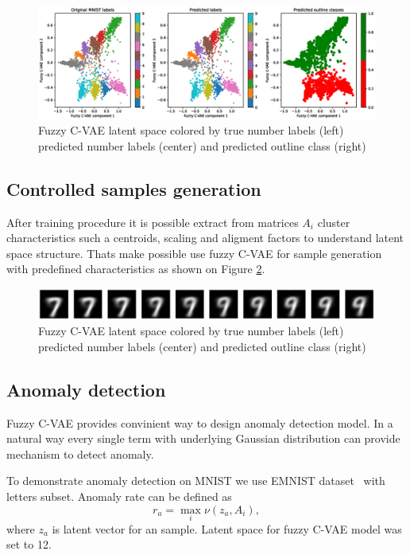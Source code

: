 \documentclass[runningheads]{llncs}
\begin{document}
\begin{figure}
    \centering
    \includegraphics[width=1\textwidth]{fig3-fcvae-classification.eps}
    \caption{Fuzzy C-VAE latent space colored by true number labels (left) predicted number labels (center) and predicted outline class (right) }
    \label{fig:fcvae-classes}
\end{figure}

\subsection{Controlled samples generation}

After training procedure it is possible extract from matrices $A_i$ cluster characteristics such a centroids, scaling and aligment factors to understand latent space structure.
Thats make possible use fuzzy C-VAE for sample generation with predefined characteristics as shown on Figure \ref{fig:samples-generation}.

\begin{figure} 
    \centering
    \includegraphics[width=1\textwidth]{fig4-sample-generation.eps}
    \caption{Fuzzy C-VAE latent space colored by true number labels (left) predicted number labels (center) and predicted outline class (right) }
    \label{fig:samples-generation}
\end{figure}

\subsection{Anomaly detection}

Fuzzy C-VAE provides convinient way to design anomaly detection model.
In a natural way every single term with underlying Gaussian distribution can provide mechanism to detect anomaly. 

To demonstrate anomaly detection on MNIST we use EMNIST dataset~\cite{cohenafshartapsonschaik2017} with letters subset.
Anomaly rate can be defined as 
\[
    r_{a} = \max_i \nu(z_{a}, A_i),
\] 
where $z_{a}$ is latent vector for an sample.
Latent space for fuzzy C-VAE model was set to 12.
\end{document}
